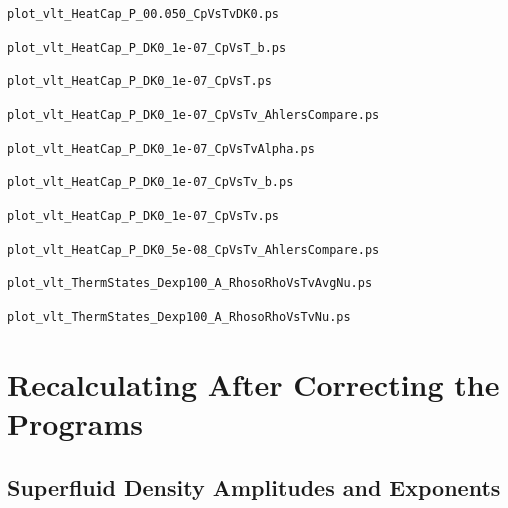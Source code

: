 \documentclass[11pt]{article}
\begin{document}
\squishlist
  \item \verb|plot_vlt_HeatCap_P_00.050_CpVsTvDK0.ps|
  \item \verb|plot_vlt_HeatCap_P_DK0_1e-07_CpVsT_b.ps|
  \item \verb|plot_vlt_HeatCap_P_DK0_1e-07_CpVsT.ps|
  \item \verb|plot_vlt_HeatCap_P_DK0_1e-07_CpVsTv_AhlersCompare.ps|
  \item \verb|plot_vlt_HeatCap_P_DK0_1e-07_CpVsTvAlpha.ps|
  \item \verb|plot_vlt_HeatCap_P_DK0_1e-07_CpVsTv_b.ps|
  \item \verb|plot_vlt_HeatCap_P_DK0_1e-07_CpVsTv.ps|
  \item \verb|plot_vlt_HeatCap_P_DK0_5e-08_CpVsTv_AhlersCompare.ps|
  \item \verb|plot_vlt_ThermStates_Dexp100_A_RhosoRhoVsTvAvgNu.ps|
  \item \verb|plot_vlt_ThermStates_Dexp100_A_RhosoRhoVsTvNu.ps|
\squishend



\newpage
\section{Recalculating After Correcting the Programs}


\subsection{Superfluid Density Amplitudes and Exponents}
\end{document}
